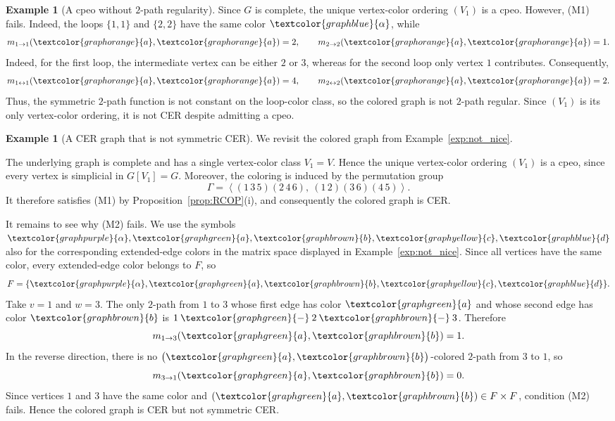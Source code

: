 \documentclass[12pt]{amsart}
\theoremstyle{plain}
\theoremstyle{definition}
\newtheorem{example}[theorem]{Example}
\theoremstyle{remark}
\newcommand{\1}{\mathbf{1}}
\begin{document}
\begin{example}[A cpeo without $2$-path regularity]
Since $G$ is complete, the unique vertex-color ordering $(V_1)$ is a cpeo.
However, (M1) fails. Indeed, the loops $\{1,1\}$ and $\{2,2\}$ have the same
color $\textcolor{graphblue}{\alpha}$, while
\[
m_{1\to 1}(\textcolor{graphorange}{a},\textcolor{graphorange}{a})=2,
\qquad
m_{2\to 2}(\textcolor{graphorange}{a},\textcolor{graphorange}{a})=1.
\]
Indeed, for the first loop, the intermediate vertex can be either $2$ or $3$, whereas
for the second loop only vertex $1$ contributes. Consequently,
\[
m_{1\leftrightarrow 1}(\textcolor{graphorange}{a},\textcolor{graphorange}{a})=4,
\qquad
m_{2\leftrightarrow 2}(\textcolor{graphorange}{a},\textcolor{graphorange}{a})=2.
\]
Thus, the symmetric $2$-path function is not constant on the loop-color class,
so the colored graph is not $2$-path regular. Since $(V_1)$ is its only
vertex-color ordering, it is not CER despite admitting a cpeo.
\end{example}

\begin{example}[A CER graph that is not symmetric CER]\label{ex:six-vertex-cer-not-symmetric}
We revisit the colored graph from Example~\ref{exp:not_nice}.

The underlying graph is complete and has a single
vertex-color class $V_1=V$. Hence the unique vertex-color ordering $(V_1)$ is a
cpeo, since every vertex is simplicial in $G[V_1]=G$. Moreover,
the coloring is induced by the permutation group
\[
\Gamma=\left\langle (1\,3\,5)(2\,4\,6),\ (1\,2)(3\,6)(4\,5)\right\rangle.
\]
It therefore satisfies (M1) by Proposition~\ref{prop:RCOP}(i), and consequently the
colored graph is CER.

It remains to see why (M2) fails. We use the symbols
$\textcolor{graphpurple}{\alpha},\textcolor{graphgreen}{a},
\textcolor{graphbrown}{b},\textcolor{graphyellow}{c},
\textcolor{graphblue}{d}$ also for the corresponding extended-edge colors in the matrix
space displayed in Example~\ref{exp:not_nice}. Since all vertices have the same
color, every extended-edge color belongs to $F$, so
\[
F=\{\textcolor{graphpurple}{\alpha},\textcolor{graphgreen}{a},
\textcolor{graphbrown}{b},\textcolor{graphyellow}{c},
\textcolor{graphblue}{d}\}.
\]
Take $v=1$ and $w=3$. The only $2$-path from $1$ to $3$ whose first edge has color
$\textcolor{graphgreen}{a}$ and whose second edge has color
$\textcolor{graphbrown}{b}$ is
$1\mathbin{\textcolor{graphgreen}{-}}2\mathbin{\textcolor{graphbrown}{-}}3$.
Therefore
\[
m_{1\to 3}(\textcolor{graphgreen}{a},\textcolor{graphbrown}{b})=1.
\]
In the reverse direction, there is no
$\bigl(\textcolor{graphgreen}{a},\textcolor{graphbrown}{b}\bigr)$-colored $2$-path from
$3$ to $1$, so
\[
m_{3\to 1}(\textcolor{graphgreen}{a},\textcolor{graphbrown}{b})=0.
\]
Since vertices $1$ and $3$ have the same color and
$(\textcolor{graphgreen}{a},\textcolor{graphbrown}{b})\in F\times F$, condition
(M2) fails. Hence the colored graph is CER but not symmetric CER.
\end{example}
\end{document}
